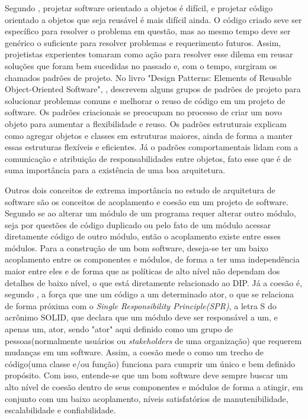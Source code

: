 \documentclass[12pt, %
openright, 
oneside, %
a4paper,    %
brazil]{facom-ufu-abntex2}
\begin{document}
Segundo , projetar software orientado a objetos é difícil, e projetar código orientado a objetos que seja reusável é mais difícil ainda. O código criado seve ser específico para resolver o problema em questão, mas ao mesmo tempo deve ser genérico o suficiente para resolver problemas e requerimento futuros. Assim, projetistas experientes tomaram como ação para resolver esse dilema em reusar soluções que foram bem sucedidas no passado e, com o tempo, surgiram os chamados padrões de projeto. No livro "Design Patterns: Elements of Reusable Object-Oriented Software", , descrevem alguns grupos de padrões de projeto para solucionar problemas comuns e melhorar o reuso de código em um projeto de software. Os padrões criacionais se preocupam no processo de criar um novo objeto para aumentar a flexibilidade e reuso. Os padrões estruturais explicam como agregar objetos e classes em estruturas maiores, ainda de forma a manter essas estruturas flexíveis e eficientes. Já o padrões comportamentais lidam com a comunicação e atribuição de responsabilidades entre objetos, fato esse que é de suma importância para a existência de uma boa arquitetura.

Outros dois conceitos de extrema importância no estudo de arquitetura de software são os conceitos de acoplamento e coesão em um projeto de software. Segundo  se ao alterar um módulo de um programa requer alterar outro módulo, seja por questões de código duplicado ou pelo fato de um módulo acessar diretamente código de outro módulo, então o acoplamento existe entre esses módulos. Para a construção de um bom software, deseja-se ter um baixo acoplamento entre os componentes e módulos, de forma a ter uma independência maior entre eles e de forma que as políticas de alto nível não dependam dos detalhes de baixo nível, o que está diretamente relacionado ao DIP. Já a coesão é, segundo , a força que une um código a um determinado ator, o que se relaciona de forma próxima com o \textit{Single Responsibility Principle(SPR)}, a letra S do acrônimo SOLID, que declara que um módulo deve ser responsável a um, e apenas um, ator, sendo "ator" aqui definido como um grupo de pessoas(normalmente usuários ou \textit{stakeholders} de uma organização) que requerem mudanças em um software. Assim, a coesão mede o como um trecho de código(uma classe e/ou função) funciona para cumprir um único e bem definido propósito. Com isso, entende-se que um bom software deve sempre buscar um alto nível de coesão dentro de seus componentes e módulos de forma a atingir, em conjunto com um baixo acoplamento, níveis satisfatórios de manutenibilidade, escalabilidade e confiabilidade.
\end{document}
